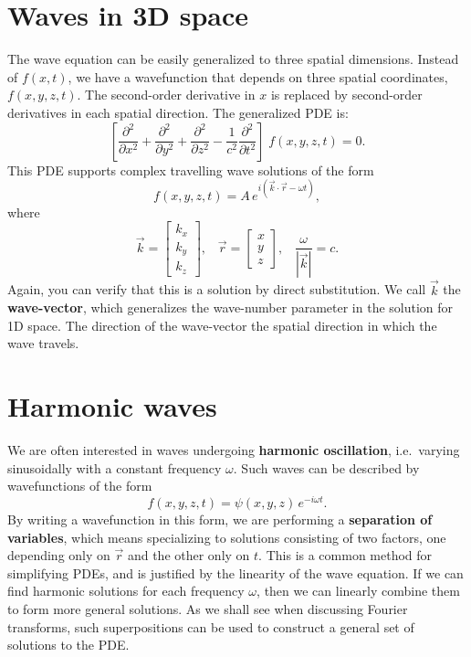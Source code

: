 \documentclass[10pt,a4paper]{article}
\begin{document}
\section{Waves in 3D space}
\label{waves-in-3d-space}

The wave equation can be easily generalized to three spatial
dimensions.  Instead of $f(x,t)$, we have a wavefunction that depends
on three spatial coordinates, $f(x,y,z,t)$. The second-order
derivative in $x$ is replaced by second-order derivatives in each
spatial direction.  The generalized PDE is:
\begin{equation}
  \left[\frac{\partial^2}{\partial x^2} + \frac{\partial^2}{\partial y^2}
    + \frac{\partial^2}{\partial z^2}
    - \frac{1}{c^2} \frac{\partial^2}{\partial t^2}\right] \; f(x,y,z,t) = 0.
  \label{3dwave}
\end{equation}
This PDE supports complex travelling wave solutions of the form
\begin{equation}
  f(x,y,z,t) = A \, e^{i(\vec{k} \cdot \vec{r} - \omega t)},
\end{equation}
where
\begin{equation}
  \vec{k} = \begin{bmatrix}k_x\\k_y\\k_z\end{bmatrix}, \;\;\;
    \vec{r} = \begin{bmatrix}x\\y\\z\end{bmatrix},
      \;\;\;\frac{\omega}{\left|\vec{k}\right|} = c.
\end{equation}
Again, you can verify that this is a solution by direct
substitution. We call $\vec{k}$ the \textbf{wave-vector}, which
generalizes the wave-number parameter in the solution for 1D
space. The direction of the wave-vector the spatial direction in which
the wave travels.

\section{Harmonic waves}
\label{harmonic-waves}

We are often interested in waves undergoing \textbf{harmonic
  oscillation}, i.e.~varying sinusoidally with a constant frequency
$\omega$. Such waves can be described by wavefunctions of the form
\begin{equation}
  f(x,y,z,t) = \psi(x,y,z) \, e^{-i\omega t}.
\end{equation}
By writing a wavefunction in this form, we are performing a
\textbf{separation of variables}, which means specializing to
solutions consisting of two factors, one depending only on $\vec{r}$
and the other only on $t$. This is a common method for simplifying
PDEs, and is justified by the linearity of the wave equation. If we
can find harmonic solutions for each frequency $\omega$, then we can
linearly combine them to form more general solutions. As we shall see
when discussing Fourier transforms, such superpositions can be used to
construct a general set of solutions to the PDE.
\end{document}

